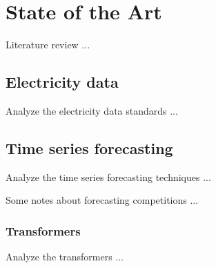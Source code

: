 \chapter{State of the Art}
\label{cha:soa}
\vspace{0.4 cm}

Literature review ...


\section{Electricity data}
\label{sec:data}
\vspace{0.2 cm}

Analyze the electricity data standards ...
\cite{CHEN201798}
\cite{8577770}
\cite{WILCOX2019250}
\cite{8284772}
\cite{5772503}


\section{Time series forecasting}
\label{sec:timeseries}
\vspace{0.2 cm}

Analyze the time series forecasting techniques ...
\cite{DEGOOIJER2006443}
\cite{SMYL202075}
\cite{Lim2021}
\cite{ZHANG2003159}
\cite{Nesreen2010}
\cite{SEZER2020106181}
\cite{en16031371}
\cite{HEWAMALAGE2021388}
\cite{BENTAIEB20127067}
\cite{CAO2003321}
\cite{LI2019104785}
\cite{DU2020269}
\cite{Sean2017}
\cite{Masini2023}
\cite{Borovykh2017}
\cite{SHEN2020302}
\cite{DEOSANTOSJUNIOR201972}
\cite{Athiyarath2020}
\cite{Cerqueira2020}
\cite{6210391}
\cite{TEALAB2018334}
\cite{Oliveira2015}
\cite{BERGMEIR2012192}

Some notes about forecasting competitions ...
\cite{HYNDMAN20207}
\cite{SPILIOTIS202037}


\vspace{0.1 cm}
\subsection{Transformers}
\label{sec:transformers}
\vspace{0.1 cm}

Analyze the transformers ...
\cite{Grigsby2021}
\cite{Wu2020}
\cite{Zhou2020}
\cite{Vaswani2017}
\cite{NIU202148}
\cite{LIM20211748}
\cite{LIU2020113082}
\cite{Shih2019}
\cite{WU2022123990}
\cite{ZHANG2022329}
\cite{9745215}
\cite{10019616}
\cite{9676694}
\cite{9892274}
\cite{9586824}
\cite{9688968}
\cite{HEIDARI2020626}

\vspace{0.1 cm}
